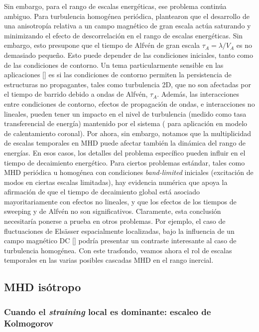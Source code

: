 Sin embargo, para el rango de escalas energéticas, ese problema
continúa ambiguo. Para turbulencia homogénea
periódica, \cite{hossain_solar_1996} plantearon que el desarrollo de
una anisotropía relativa a un campo magnético de gran escala actúa
saturando y minimizando el efecto de descorrelación en el rango de
escalas energéticas. Sin embargo, esto presupone que el tiempo de
Alfv\'en de gran escala $\tau_A = \lambda/V_A$ es no demasiado
pequeño. Esto puede depender de las condiciones iniciales, tanto como
de las condiciones de contorno. Un tema particularmente sensible en
las aplicaciones [\cite{dmitruk_conditions_2001}] es si las
condiciones de contorno permiten la persistencia de estructuras no
propagantes, tales como turbulencia 2D, que no son afectadas por el
tiempo de barrido debido a ondas de Alfv\'en, $\tau_A$. Además, las
interacciones entre condiciones de contorno, efectos de propagación de
ondas, e interacciones no lineales, pueden tener un impacto en el
nivel de turbulencia (medido como tasa transferencial de energía)
mantenido por el sistema (\cite{dmitruk_lowfrequency_2003} para
aplicación en modelo de calentamiento coronal). Por ahora, sin
embargo, notamos que la multiplicidad de escalas temporales en MHD
puede afectar también la dinámica del rango de energías. En esos
casos, los detalles del problema específico pueden influir en el
tiempo de decaimiento energético. Para ciertos problemas estándar,
tales como MHD periódica u homogénea con condiciones
\textit{band-limited} iniciales (excitación de modos en ciertas
escalas limitadas), hay evidencia numérica que apoya la afirmación de
que el tiempo de decaimiento global está asociado mayoritariamente con
efectos no lineales, y que los efectos de los tiempos de sweeping y de
Alfv\'en no son significativos. Claramente, esta conclusión
necesitaría ponerse a prueba en otros problemas. Por ejemplo, el caso
de fluctuaciones de Els\"asser espacialmente localizadas, bajo la
influencia de un campo magnético DC [\cite{parker_cosmical_2019}]
podría presentar un contraste interesante al caso de turbulencia
homogénea. Con este trasfondo, veamos ahora el rol de escalas
temporales en las varias posibles cascadas MHD en el rango inercial.


\subsection{MHD isótropo}
\subsubsection{Cuando el \textit{straining} local es dominante: escaleo de Kolmogorov}

